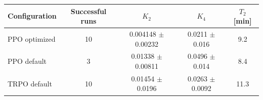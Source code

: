 \begin{tabular}{lcccc}
\toprule
Configuration & Successful runs & $K_2$ & $K_4$ & $T_2$ [min] \\
\midrule
PPO optimized & 10 & 0.004148 $\pm$ 0.00232 & 0.0211 $\pm$ 0.016 & 9.2 \\
PPO default & 3 & 0.01338 $\pm$ 0.00811 & 0.0496 $\pm$ 0.014 & 8.4 \\
TRPO default & 10 & 0.01454 $\pm$ 0.0196 & 0.0263 $\pm$ 0.0092 & 11.3 \\
\bottomrule
\end{tabular}
